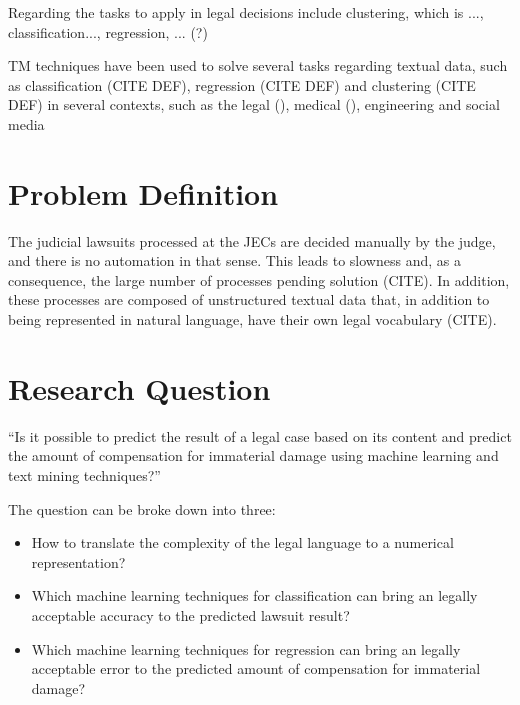 Regarding the tasks to apply in legal decisions include clustering, which is ..., classification..., regression, ... (?)

TM techniques have been used to solve several tasks regarding textual data, such as classification (CITE DEF), regression (CITE DEF) and clustering (CITE DEF) in several contexts, such as the legal (), medical (), engineering and social media




\section{Problem Definition} %

The judicial lawsuits processed at the JECs are decided manually by the judge, and there is no automation in that sense. This leads to slowness and, as a consequence, the large number of processes pending solution (CITE). In addition, these processes are composed of unstructured textual data that, in addition to being represented in natural language, have their own legal vocabulary (CITE). 


% 

\section{Research Question}

``Is it possible to predict the result of a legal case based on its content and predict the amount of compensation for immaterial damage using machine learning and text mining techniques?''

The question can be broke down into three:

\begin{itemize}[noitemsep]
    \item How to translate the complexity of the legal language to a numerical representation?
    \item Which machine learning techniques for classification can bring an legally acceptable accuracy to the predicted lawsuit result?
    \item Which machine learning techniques for regression can bring an legally acceptable error to the predicted amount of compensation for immaterial damage?
\end{itemize}

